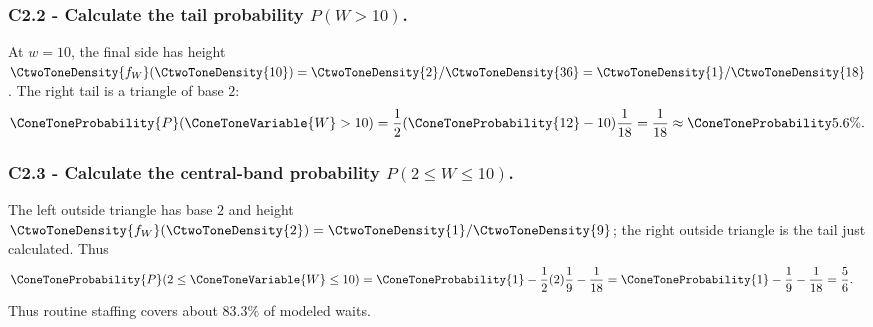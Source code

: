 \subsubsection*{C2.2 - Calculate the tail probability $P(W>10)$.}
\label{subsec:c2-piecewise-linear-gate-b}
At $w=10$, the final side has height $\CtwoToneDensity{f_W}(\CtwoToneDensity{10})=\CtwoToneDensity{2}/\CtwoToneDensity{36}=\CtwoToneDensity{1}/\CtwoToneDensity{18}$.  The right tail is
a triangle of base $2$:
\[
 \ConeToneProbability{P}(\ConeToneVariable{W}>10)=\frac12(\ConeToneProbability{12}-10)\frac1{18}=\frac1{18}\approx\ConeToneProbability{5.6\%}.
\]

\subsubsection*{C2.3 - Calculate the central-band probability
$P(2\le W\le10)$.}
\label{subsec:c2-piecewise-linear-gate-c}
The left outside triangle has base $2$ and height $\CtwoToneDensity{f_W}(\CtwoToneDensity{2})=\CtwoToneDensity{1}/\CtwoToneDensity{9}$; the right
outside triangle is the tail just calculated.  Thus
\[
 \begin{aligned}
 \ConeToneProbability{P}(2\le \ConeToneVariable{W}\le10)
 &=\ConeToneProbability{1}-\frac12(2)\frac19-\frac1{18}
 =\ConeToneProbability{1}-\frac19-\frac1{18}=\frac56.
 \end{aligned}
\]
Thus routine staffing covers about $83.3\%$ of modeled waits.


